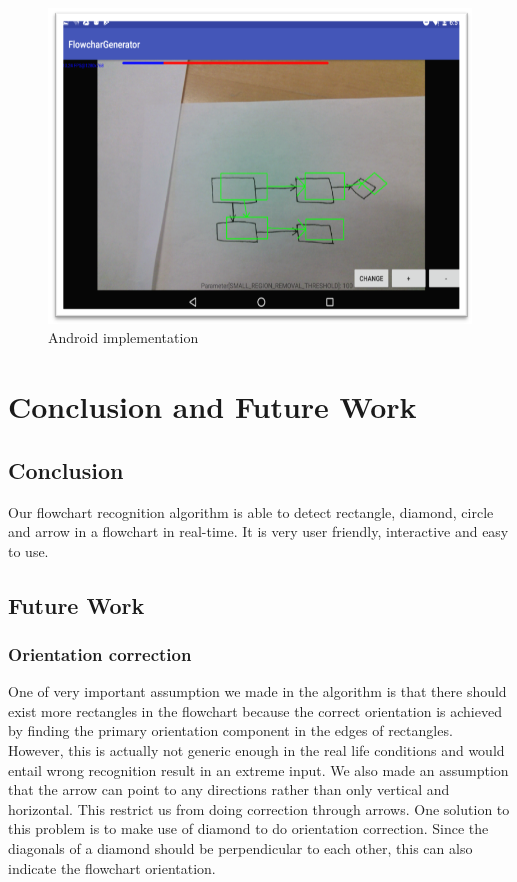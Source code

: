 \documentclass[conference,twocolumn]{IEEEtran}
\begin{document}
\begin{figure}[!htbp]
\begin{center}
\includegraphics[scale=0.6]{android.png}
\caption{Android implementation}
\label{fig: android_bottom}
\end{center}
\end{figure}


\section{Conclusion and Future Work}

\subsection{Conclusion}
Our flowchart recognition algorithm is able to detect rectangle, diamond, circle and arrow in a flowchart in real-time. It is very user friendly, interactive and easy to use. 

\subsection{Future Work}

\subsubsection{Orientation correction}
One of very important assumption we made in the algorithm is that there should exist more rectangles in the flowchart because the correct orientation is achieved by finding the primary orientation component in the edges of rectangles. However, this is actually not generic enough in the real life conditions and would entail wrong recognition result in an extreme input. We also made an assumption that the arrow can point to any directions rather than only vertical and horizontal. This restrict us from doing correction through arrows. One solution to this problem is to make use of diamond to do orientation correction. Since the diagonals of a diamond should be perpendicular to each other, this can also indicate the flowchart orientation.
\end{document}
